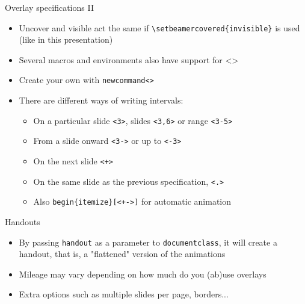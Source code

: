 \documentclass[english]{beamer}
\let\olditem\item
\renewcommand{\item}{\setlength{\itemsep}{\fill}\olditem}
\newenvironment{sitemize}{\let\item\olditem \begin{itemize}}{\vfill\end{itemize}}
\let\textttt\texttt
\renewcommand{\texttt}[1]{\colorbox{gray!10}{\textttt{#1}}}
\begin{document}

\begin{frame}[fragile]{Overlay specifications II}
\begin{itemize}
    \item Uncover and visible act the same if \verb|\setbeamercovered{invisible}| is used (like in this presentation)
    \item Several macros and environments also have support for <>
    \item Create your own with \texttt{newcommand<>}
    \item There are different ways of writing intervals:
        \begin{sitemize}[<+->]
            \item On a particular slide \texttt{<3>}, slides \texttt{<3,6>} or range \texttt{<3-5>}
            \item From a slide onward \texttt{<3->} or up to \texttt{<-3>}
            \item On the next slide \texttt{<+>}
            \item On the same slide as the previous specification, \texttt{<.>} 
            \item Also \texttt{begin\{itemize\}[<+->]} for automatic animation
        \end{sitemize}
\end{itemize}
\end{frame}

\begin{frame}{Handouts}
    \begin{itemize}
        \item By passing \texttt{handout} as a parameter to \texttt{documentclass}, it will create a handout, that is, a "flattened" version of the animations
        \item Mileage may vary depending on how much do you (ab)use overlays
        \item Extra options such as multiple slides per page, borders...
    \end{itemize}
\end{frame}
\end{document}
